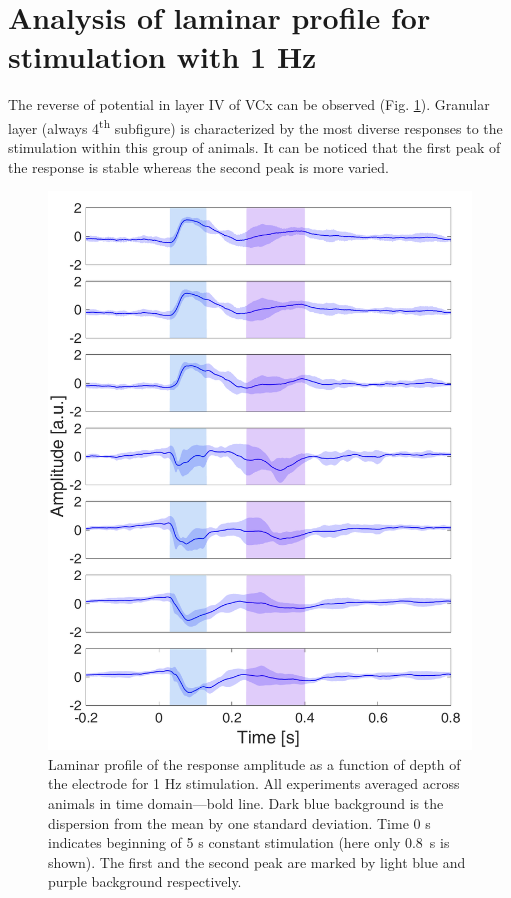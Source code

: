 \documentclass{pracalicmgr}
\begin{document}
    
    \section{Analysis of laminar profile for stimulation with 1 Hz}
        The reverse of potential in layer IV of VCx can be observed (Fig. \ref{rys:srednie_1Hz_1s}). Granular layer (always 4\textsuperscript{th} subfigure) is characterized by the most diverse responses to the stimulation within this group of animals. It can be noticed that the first peak of the response is stable whereas the second peak is more varied. 
    \begin{figure}[H]
    	\centering
    	\includegraphics[scale=0.35]{usrednianie_z_tlem.png}
    	\caption{Laminar profile of the response amplitude as a function of depth of the electrode for 1 Hz stimulation. All experiments averaged across animals in time domain---bold line. Dark blue background is the dispersion from the mean by one standard deviation. Time 0 s indicates beginning of 5 s constant stimulation (here only 0.8~s is shown). The first and the second peak are marked by light blue and purple background respectively.}
    	\label{rys:srednie_1Hz_1s}
    \end{figure}
    
\end{document}
